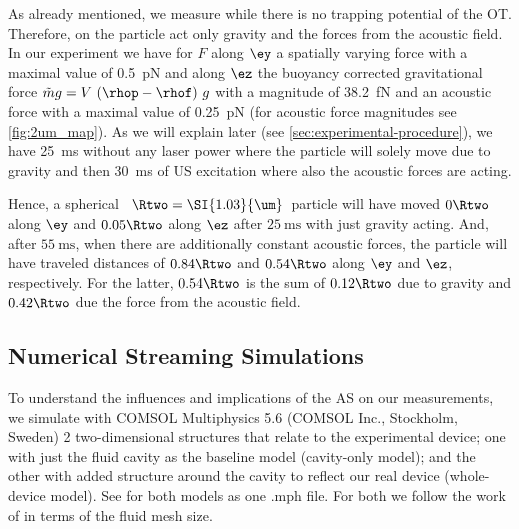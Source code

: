 As already mentioned, we measure while there is no trapping potential of the 
OT. Therefore, on the particle act only gravity and the forces from the 
acoustic field. In our experiment we have for $F$ along $\ey$ a spatially 
varying force with a maximal value of \SI{0.5}{\pico\newton} and along $\ez$ 
the buoyancy corrected gravitational force $\tilde{m}g=V\,\left( \rhop-\rhof 
\right)\,g$ with a magnitude of \SI{38.2}{\femto\newton} and an acoustic force 
with a maximal value of \SI{0.25}{\pico\newton} (for acoustic force magnitudes 
see \cref{fig:2um_map}). As we will explain later (see 
\cref{sec:experimental-procedure}), we have \SI{25}{\ms} without any laser 
power where the particle will solely move due to gravity and then \SI{30}{\ms} 
of US excitation where also the acoustic forces are acting.

Hence, a spherical \SiO~$\Rtwo=\SI{1.03}{\um}$~particle will have moved 
$0\Rtwo$ along $\ey$ and $0.05\Rtwo$ along $\ez$ after $\SI{25}{\ms}$ with just 
gravity acting. And, after $\SI{55}{\ms}$, when there are additionally 
constant acoustic forces, the particle will have traveled distances of 
$0.84\Rtwo$ and $0.54\Rtwo$ along $\ey$ and $\ez$, respectively. For the 
latter, $0.54\Rtwo$ is the sum of $0.12\Rtwo$ due to gravity and $0.42\Rtwo$ 
due the force from the acoustic field.

\subsection{Numerical Streaming Simulations}

To understand the influences and implications of the AS on our measurements, we 
simulate with {\ttfamily COMSOL Multiphysics 5.6} (COMSOL Inc., Stockholm, 
Sweden) 2 two-dimensional structures that relate to the experimental device; 
one with just the fluid cavity as the baseline model (cavity-only model); and 
the other with added structure around the cavity to reflect our real device 
(whole-device model). See \cite{supplemental} for both models as one {\ttfamily 
.mph} file. For both we follow the work of \citeauthor{Muller2015} 
\cite{Muller2015} in terms of the fluid mesh size.

